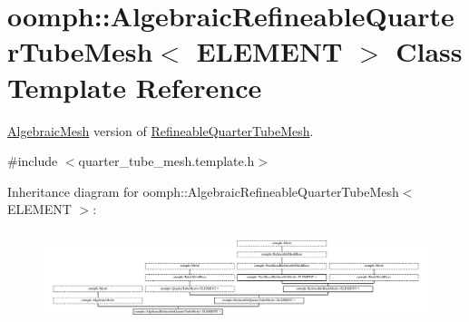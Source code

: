 \hypertarget{classoomph_1_1AlgebraicRefineableQuarterTubeMesh}{}\section{oomph\+:\+:Algebraic\+Refineable\+Quarter\+Tube\+Mesh$<$ E\+L\+E\+M\+E\+NT $>$ Class Template Reference}
\label{classoomph_1_1AlgebraicRefineableQuarterTubeMesh}


\hyperlink{classoomph_1_1AlgebraicMesh}{Algebraic\+Mesh} version of \hyperlink{classoomph_1_1RefineableQuarterTubeMesh}{Refineable\+Quarter\+Tube\+Mesh}.  




{\ttfamily \#include $<$quarter\+\_\+tube\+\_\+mesh.\+template.\+h$>$}

Inheritance diagram for oomph\+:\+:Algebraic\+Refineable\+Quarter\+Tube\+Mesh$<$ E\+L\+E\+M\+E\+NT $>$\+:\begin{figure}[H]
\begin{center}
\leavevmode
\includegraphics[height=2.699725cm]{classoomph_1_1AlgebraicRefineableQuarterTubeMesh}
\end{center}
\end{figure}
